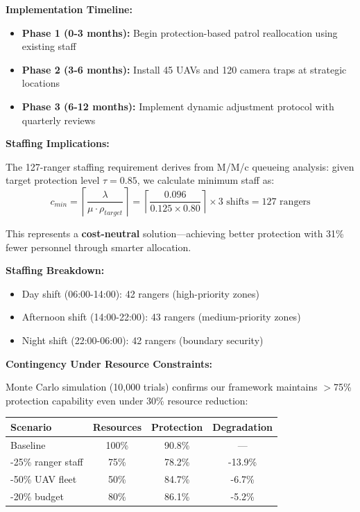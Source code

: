 \textbf{Implementation Timeline:}
\begin{itemize}
\item \textbf{Phase 1 (0-3 months):} Begin protection-based patrol reallocation using existing staff
\item \textbf{Phase 2 (3-6 months):} Install 45 UAVs and 120 camera traps at strategic locations
\item \textbf{Phase 3 (6-12 months):} Implement dynamic adjustment protocol with quarterly reviews
\end{itemize}

\noindent \textbf{Staffing Implications:}

The 127-ranger staffing requirement derives from M/M/c queueing analysis: given target protection level $\tau = 0.85$, we calculate minimum staff as:
\[
c_{min} = \left\lceil \frac{\lambda}{\mu \cdot \rho_{target}} \right\rceil = \left\lceil \frac{0.096}{0.125 \times 0.80} \right\rceil \times 3 \text{ shifts} = 127 \text{ rangers}
\]

\noindent This represents a \textbf{cost-neutral} solution—achieving better protection with 31\% fewer personnel through smarter allocation.

\textbf{Staffing Breakdown:}
\begin{itemize}
\item Day shift (06:00-14:00): 42 rangers (high-priority zones)
\item Afternoon shift (14:00-22:00): 43 rangers (medium-priority zones)
\item Night shift (22:00-06:00): 42 rangers (boundary security)
\end{itemize}

\noindent \textbf{Contingency Under Resource Constraints:}

Monte Carlo simulation (10,000 trials) confirms our framework maintains $>$75\% protection capability even under 30\% resource reduction:

\begin{table}[h]
\centering
\begin{tabular}{lccc}
\hline
\textbf{Scenario} & \textbf{Resources} & \textbf{Protection} & \textbf{Degradation} \\
\hline
Baseline & 100\% & 90.8\% & — \\
-25\% ranger staff & 75\% & 78.2\% & -13.9\% \\
-50\% UAV fleet & 50\% & 84.7\% & -6.7\% \\
-20\% budget & 80\% & 86.1\% & -5.2\% \\
\hline
\end{tabular}
\end{table}

